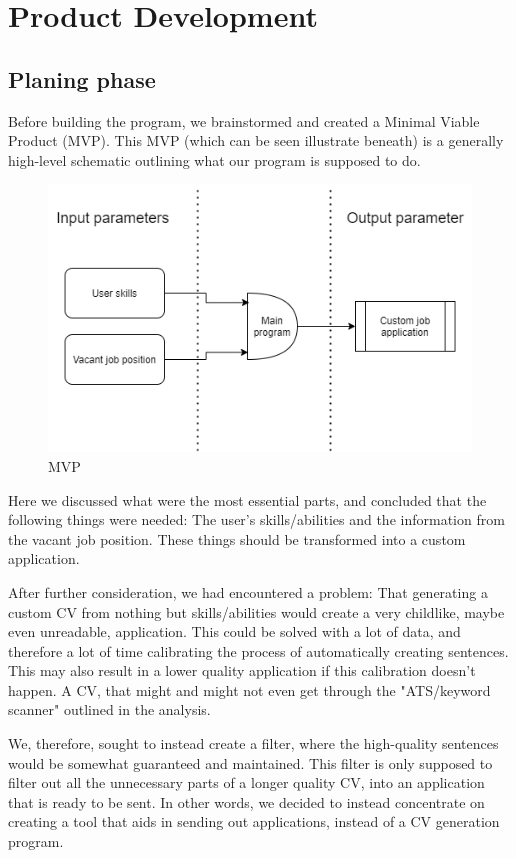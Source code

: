 \section{Product Development}\label{sec:product_development}
\subsection{Planing phase}
Before building the program, we brainstormed and created a Minimal Viable Product (MVP).
This MVP (which can be seen illustrate beneath) is a generally high-level schematic outlining what our program is supposed to do.

\begin{figure}[H]
  \centering
  \includegraphics[scale = 0.6]{figures/engMVP}
  \caption{MVP}
\end{figure}
Here we discussed what were the most essential parts, and concluded that the following things
were needed: The user's skills/abilities and the information from the vacant job position. These things
should be transformed into a custom application. 

After further consideration, we had encountered a problem: That generating a custom CV from nothing but
skills/abilities would create a very childlike, maybe even unreadable, application. This could be solved with a lot
of data, and therefore a lot of time calibrating the process of automatically creating sentences. This may also result
in a lower quality application if this calibration doesn't happen. 
A CV, that might and might not even get through the "ATS/keyword scanner" outlined in the analysis. 

We, therefore, sought to instead create a filter, where the high-quality sentences would be somewhat guaranteed and maintained.
This filter is only supposed to filter out all the unnecessary parts of a longer quality CV, into an application that
is ready to be sent. In other words, we decided to instead concentrate on creating a tool that aids
in sending out applications, instead of a CV generation program.

